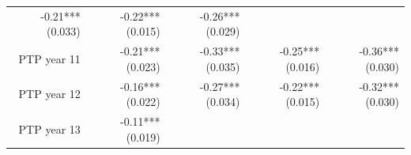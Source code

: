\documentclass[]{article}
\begin{document}
\begin{longtable}[c]{@{}rrrrr@{}}
\begin{minipage}[t]{0.16\columnwidth}
-0.21*** (0.033)
\strut\end{minipage} &
\begin{minipage}[t]{0.18\columnwidth}\raggedleft\strut
-0.22*** (0.015)
\strut\end{minipage} &
\begin{minipage}[t]{0.15\columnwidth}\raggedleft\strut
-0.26*** (0.029)
\strut\end{minipage}\tabularnewline
\begin{minipage}[t]{0.17\columnwidth}\raggedleft\strut
PTP year 11
\strut\end{minipage} &
\begin{minipage}[t]{0.20\columnwidth}\raggedleft\strut
-0.21*** (0.023)
\strut\end{minipage} &
\begin{minipage}[t]{0.16\columnwidth}\raggedleft\strut
-0.33*** (0.035)
\strut\end{minipage} &
\begin{minipage}[t]{0.18\columnwidth}\raggedleft\strut
-0.25*** (0.016)
\strut\end{minipage} &
\begin{minipage}[t]{0.15\columnwidth}\raggedleft\strut
-0.36*** (0.030)
\strut\end{minipage}\tabularnewline
\begin{minipage}[t]{0.17\columnwidth}\raggedleft\strut
PTP year 12
\strut\end{minipage} &
\begin{minipage}[t]{0.20\columnwidth}\raggedleft\strut
-0.16*** (0.022)
\strut\end{minipage} &
\begin{minipage}[t]{0.16\columnwidth}\raggedleft\strut
-0.27*** (0.034)
\strut\end{minipage} &
\begin{minipage}[t]{0.18\columnwidth}\raggedleft\strut
-0.22*** (0.015)
\strut\end{minipage} &
\begin{minipage}[t]{0.15\columnwidth}\raggedleft\strut
-0.32*** (0.030)
\strut\end{minipage}\tabularnewline
\begin{minipage}[t]{0.17\columnwidth}\raggedleft\strut
PTP year 13
\strut\end{minipage} &
\begin{minipage}[t]{0.20\columnwidth}\raggedleft\strut
-0.11*** (0.019)
\strut\end{minipage} &
\begin{minipage}[t]{0.16\columnwidth}\raggedleft\strut

\end{minipage}
\end{longtable}
\end{document}
